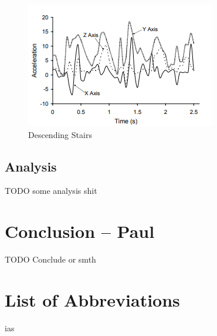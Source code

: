 \documentclass[conference]{IEEEtran}
\begin{document}
\begin{figure}[!htb]
  \includegraphics[width=\linewidth]{descending_stairs.png}
  \caption{Descending Stairs}
  \label{fig:descendingStairs}
\end{figure}

\newpage

\subsection{Analysis}

TODO some analysis shit

\section{Conclusion -- Paul}

TODO Conclude or smth

\section*{List of Abbreviations}
\begin{acronym}[XXXXXXXX]
\end{acronym}
ias
\\
\\
\\
\\
\\
\\
\\
\\
\\
\\
\\
\\
\\
\\
\\
\\
\\
\\
\end{document}
